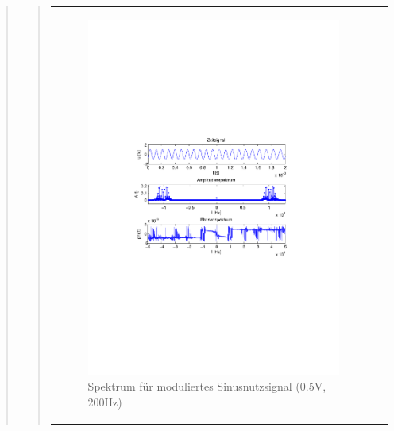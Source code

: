 \begin{quote}
\begin{quote}
            
                   \begin{center}
            \begin{tabular}{ll}

            \hspace{-14em}
                \begin{minipage}{0.6\textwidth}

                    \begin{figure}[H]
                        \label{fig:}
                        \includegraphics[scale=0.5, trim = 2cm 6.5cm 1.5cm
                        8.5cm, clip]{./Bilder/sin_a05_f200}
                        \caption{Spektrum für moduliertes Sinusnutzsignal (0.5V,
                        200Hz)}
                    \end{figure}


\end{minipage}
\end{tabular}
\end{center}
\end{quote}
\end{quote}
